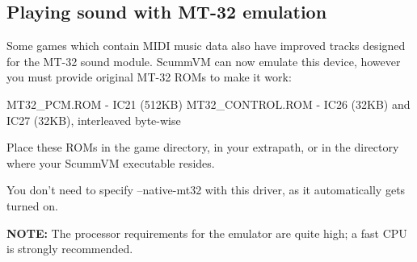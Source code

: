 


\subsection{Playing sound with MT-32 emulation}

Some games which contain MIDI music data also have improved tracks designed
for the MT-32 sound module. ScummVM can now emulate this device, however you
must provide original MT-32 ROMs to make it work:

MT32\_PCM.ROM     - IC21 (512KB)
MT32\_CONTROL.ROM - IC26 (32KB) and IC27 (32KB), interleaved byte-wise

Place these ROMs in the game directory, in your extrapath, or in the directory
where your ScummVM executable resides.

You don't need to specify --native-mt32 with this driver, as it automatically
gets turned on.

\textbf{NOTE:} The processor requirements for the emulator are quite high; a fast CPU is
 strongly recommended.
